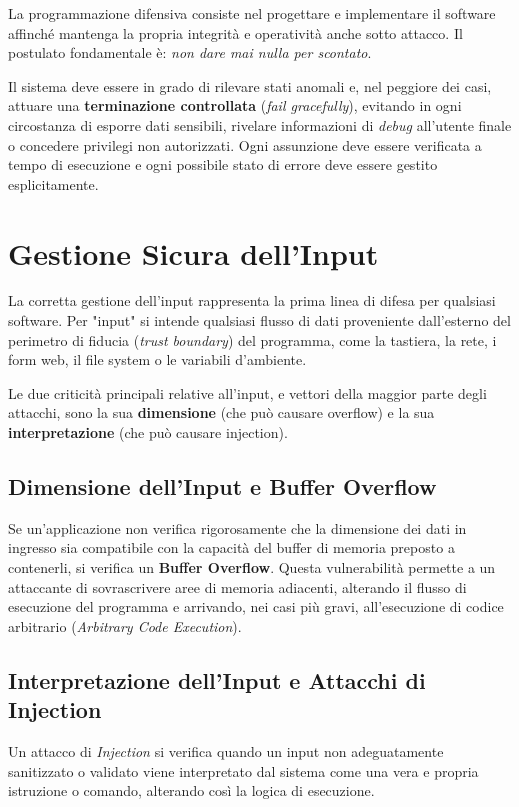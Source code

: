 \begin{notebox}
La programmazione difensiva consiste nel progettare e implementare il software affinché mantenga la propria integrità e operatività anche sotto attacco. Il postulato fondamentale è: \textit{non dare mai nulla per scontato}. 
\end{notebox}

Il sistema deve essere in grado di rilevare stati anomali e, nel peggiore dei casi, attuare una \textbf{terminazione controllata} (\textit{fail gracefully}), evitando in ogni circostanza di esporre dati sensibili, rivelare informazioni di \textit{debug} all'utente finale o concedere privilegi non autorizzati. Ogni assunzione deve essere verificata a tempo di esecuzione e ogni possibile stato di errore deve essere gestito esplicitamente.

\section{Gestione Sicura dell'Input}
La corretta gestione dell'input rappresenta la prima linea di difesa per qualsiasi software. Per "input" si intende qualsiasi flusso di dati proveniente dall'esterno del perimetro di fiducia (\textit{trust boundary}) del programma, come la tastiera, la rete, i form web, il file system o le variabili d'ambiente.

\begin{warnbox}
Le due criticità principali relative all'input, e vettori della maggior parte degli attacchi, sono la sua \textbf{dimensione} (che può causare overflow) e la sua \textbf{interpretazione} (che può causare injection).
\end{warnbox}

\subsection{Dimensione dell'Input e Buffer Overflow}
Se un'applicazione non verifica rigorosamente che la dimensione dei dati in ingresso sia compatibile con la capacità del buffer di memoria preposto a contenerli, si verifica un \textbf{Buffer Overflow}.
Questa vulnerabilità permette a un attaccante di sovrascrivere aree di memoria adiacenti, alterando il flusso di esecuzione del programma e arrivando, nei casi più gravi, all'esecuzione di codice arbitrario (\textit{Arbitrary Code Execution}). 

\subsection{Interpretazione dell'Input e Attacchi di Injection}
Un attacco di \textit{Injection} si verifica quando un input non adeguatamente sanitizzato o validato viene interpretato dal sistema come una vera e propria istruzione o comando, alterando così la logica di esecuzione.

